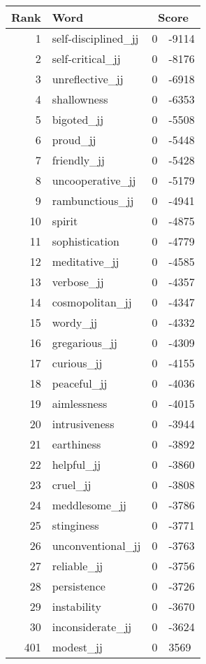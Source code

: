 \begin{longtable}[!htbp]{| rlr@{.}l |}
    \hline
    \textbf{Rank} & \textbf{Word} & \multicolumn{2}{c|}{\textbf{Score}} \\
    \hline
    \endhead
    1 & self-disciplined\_jj & 0 & -9114 \\
    2 & self-critical\_jj & 0 & -8176 \\
    3 & unreflective\_jj & 0 & -6918 \\
    4 & shallowness & 0 & -6353 \\
    5 & bigoted\_jj & 0 & -5508 \\
    6 & proud\_jj & 0 & -5448 \\
    7 & friendly\_jj & 0 & -5428 \\
    8 & uncooperative\_jj & 0 & -5179 \\
    9 & rambunctious\_jj & 0 & -4941 \\
    10 & spirit & 0 & -4875 \\
    11 & sophistication & 0 & -4779 \\
    12 & meditative\_jj & 0 & -4585 \\
    13 & verbose\_jj & 0 & -4357 \\
    14 & cosmopolitan\_jj & 0 & -4347 \\
    15 & wordy\_jj & 0 & -4332 \\
    16 & gregarious\_jj & 0 & -4309 \\
    17 & curious\_jj & 0 & -4155 \\
    18 & peaceful\_jj & 0 & -4036 \\
    19 & aimlessness & 0 & -4015 \\
    20 & intrusiveness & 0 & -3944 \\
    21 & earthiness & 0 & -3892 \\
    22 & helpful\_jj & 0 & -3860 \\
    23 & cruel\_jj & 0 & -3808 \\
    24 & meddlesome\_jj & 0 & -3786 \\
    25 & stinginess & 0 & -3771 \\
    26 & unconventional\_jj & 0 & -3763 \\
    27 & reliable\_jj & 0 & -3756 \\
    28 & persistence & 0 & -3726 \\
    29 & instability & 0 & -3670 \\
    30 & inconsiderate\_jj & 0 & -3624 \\
    401 & modest\_jj & 0 & 3569 \\

\end{longtable}
